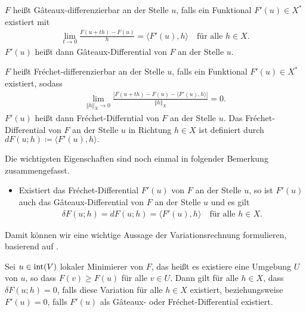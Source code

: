 \begin{definition}
  $F$ heißt G\^ateaux-differenzierbar an der Stelle $u$, falls ein 
  Funktional $F'(u)\in X^\ast$ existiert mit 
  \begin{align*}
    \lim_{t\to 0}\frac{F(u+th)-F(u)}{h} = \langle F'(u), h\rangle\quad
    \text{für alle } h\in X.
  \end{align*}
  $F'(u)$ heißt dann G\^ateaux-Differential von $F$ an der Stelle $u$.

  $F$ heißt Fr\'echet-differenzierbar an der Stelle $u$, falls ein Funktional
  $F'(u)\in X^\ast$ existiert, sodass
  \begin{align*}
    \lim_{\Vert h\Vert_X\to 0}\frac{|F(u+th)-F(u)-
    \langle F'(u),h\rangle|}{\Vert h\Vert_X} =0.
  \end{align*}
  $F'(u)$ heißt dann Fr\'echet-Differntial von $F$ an der Stelle $u$.
  Das Fr\'echet-Differential von $F$ an der Stelle $u$ in Richtung $h\in X$
  ist definiert durch $dF(u;h)\coloneq \langle F'(u),h\rangle.$
\end{definition}

Die wichtigsten Eigenschaften sind noch einmal in folgender Bemerkung 
zusammengefasst.

\begin{remark}
  \begin{itemize}
    \item Existiert das Fr\'echet-Differential $F'(u)$ von $F$ an der Stelle
      $u$, so ist $F'(u)$ auch das G\^ateaux-Differential von $F$ an der Stelle
      $u$ und es gilt 
      \begin{align*}
        \delta F(u;h)=dF(u;h)=\langle F'(u),h\rangle\quad\text{für alle } h\in
        X.
      \end{align*}
  \end{itemize}
\end{remark}

Damit können wir eine wichtige Aussage der Variationsrechnung formulieren,
basierend auf \cite[S. 193ff., Theorem 40.A, Theorem 40.B]{Zei85}.

\begin{theorem}
  \label{thm:necessaryConditionFreeLocalExtrema}
  Sei $u\in \operatorname{int}(V)$ lokaler Minimierer von $F$, das heißt
  es existiere eine Umgebung 
  $U$ von $u$, so dass $F(v)\geq F(u)$ für alle $v\in U$. Dann gilt für alle
  $h\in X$, dass $\delta F(u;h) = 0$, falls diese Variation für alle $h\in X$
  existiert, beziehungsweise $F'(u) = 0$, falls $F'(u)$ als 
  G\^ateaux- oder Fr\'echet-Differential existiert.
\end{theorem}

